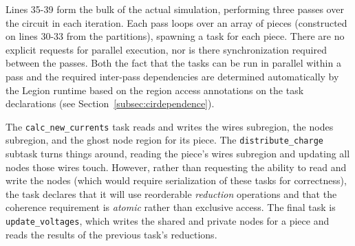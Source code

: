 


Lines 35-39 form the bulk of the actual simulation, performing three passes
over the circuit in each iteration.  Each pass loops over an array of pieces (constructed on lines 30-33 from the partitions),
spawning a task for each piece.   There are no explicit requests for
parallel execution, nor is there synchronization required between the
passes.  Both the fact that the tasks can be run in parallel within a pass
and the required inter-pass dependencies are determined automatically
by the Legion runtime based on the region access annotations on the task declarations
(see Section~\ref{subsec:cirdependence}).

The  {\tt calc\_new\_currents} task reads and writes the wires subregion, 
the nodes subregion, and the ghost node region for its piece.
The {\tt distribute\_charge} subtask turns things around, reading the piece's 
wires subregion and updating all nodes those wires touch.  However,
rather than requesting the ability to read and write the nodes (which would
require serialization of these tasks for correctness), the task declares that
it will use reorderable {\em reduction} operations and that the coherence requirement
is {\em atomic} rather than exclusive access. The final task is 
{\tt update\_voltages}, which writes the shared and private nodes for a piece
and reads the results of the previous task's reductions.

